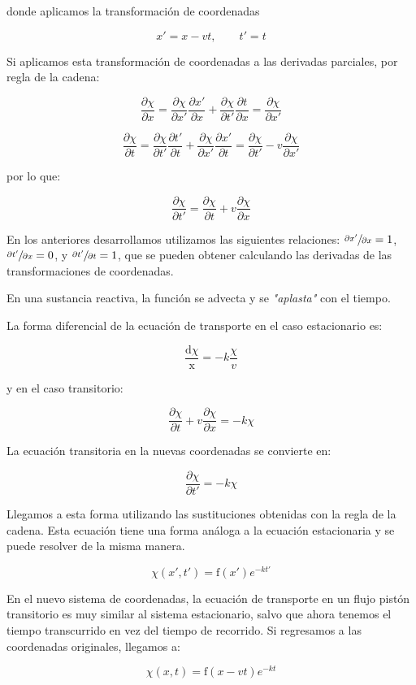 \documentclass[11pt]{article}
\begin{document}
donde aplicamos la transformación de coordenadas

\[ \boxed{ x' = x -vt , \qquad t' = t } \]

Si aplicamos esta transformación de coordenadas a las derivadas parciales, por regla de la cadena:

\[ \frac{ \partial \chi }{ \partial x } = \frac{ \partial \chi }{ \partial x' } \frac{ \partial x' }{ \partial x } + \frac{ \partial \chi }{ \partial t' } \frac{ \partial t }{ \partial x } = \frac{ \partial \chi }{ \partial x' } \]

\[ \frac{ \partial \chi }{ \partial t } = \frac{ \partial \chi }{ \partial t' } \frac{ \partial t' }{ \partial t } + \frac{ \partial \chi }{ \partial x' } \frac{ \partial x' }{ \partial t } = \frac{ \partial \chi }{ \partial t' } - v \frac{ \partial \chi }{ \partial x' } \]

por lo que:

\[ \frac{ \partial \chi }{ \partial t' } = \frac{ \partial \chi }{ \partial t } + v \frac{ \partial \chi }{ \partial x } \]

En los anteriores desarrollamos utilizamos las siguientes relaciones: \( \sfrac{ \partial x' }{ \partial x } = 1 \), \( \sfrac{ \partial t' }{ \partial x } = 0 \), y \( \sfrac{ \partial t' }{ \partial t } = 1 \), que se pueden obtener calculando las derivadas de las transformaciones de coordenadas.

En una sustancia reactiva, la función se advecta y se \textit{"aplasta"} con el tiempo.

La forma diferencial de la ecuación de transporte en el caso estacionario es:

\[ \frac{ \mathrm d \chi }{ \mathrm x } = -k \frac{\chi}{v} \]

y en el caso transitorio:

\[ \frac{ \partial \chi }{ \partial t } + v \frac{ \partial \chi }{ \partial x } = -k \chi \]

La ecuación transitoria en la nuevas coordenadas se convierte en:

\[ \frac{ \partial \chi }{ \partial t' } = -k \chi \]

Llegamos a esta forma utilizando las sustituciones obtenidas con la regla de la cadena. Esta ecuación tiene una forma análoga a la ecuación estacionaria y se puede resolver de la misma manera.

\[ \chi \left( x', t' \right) = \mathrm f \left( x' \right) e ^ { -k t' } \]

En el nuevo sistema de coordenadas, la ecuación de transporte en un flujo pistón transitorio es muy similar al sistema estacionario, salvo que ahora tenemos el tiempo transcurrido en vez del tiempo de recorrido. Si regresamos a las coordenadas originales, llegamos a:

\[ \boxed{ \chi \left( x, t \right) = \mathrm f \left( x - v t \right) e ^ { -k t } } \]

\end{document}
